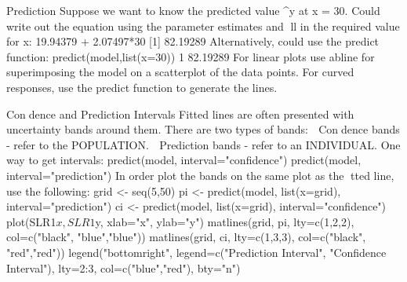Prediction
Suppose we want to know the predicted value ^y at x = 30. Could
write out the equation using the parameter estimates and ll in the
required value for x:
19.94379 + 2.07497*30
[1] 82.19289
Alternatively, could use the predict function:
predict(model,list(x=30))
1
82.19289
For linear plots use abline for superimposing the model on a
scatterplot of the data points. For curved responses, use the
predict function to generate the lines.

Condence and Prediction Intervals
Fitted lines are often presented with uncertainty bands around
them. There are two types of bands:
 Condence bands - refer to the POPULATION.
 Prediction bands - refer to an INDIVIDUAL.
One way to get intervals:
predict(model, interval="confidence")
predict(model, interval="prediction")
In order plot the bands on the same plot as the tted line, use the
following:
grid <- seq(5,50)
pi <- predict(model, list(x=grid), interval="prediction")
ci <- predict(model, list(x=grid), interval="confidence")
plot(SLR1$x, SLR1$y, xlab="x", ylab="y")
matlines(grid, pi, lty=c(1,2,2), col=c("black", "blue","blue"))
matlines(grid, ci, lty=c(1,3,3), col=c("black", "red","red"))
legend("bottomright", legend=c("Prediction Interval", "Confidence Interval"),
lty=2:3, col=c("blue","red"), bty="n")
